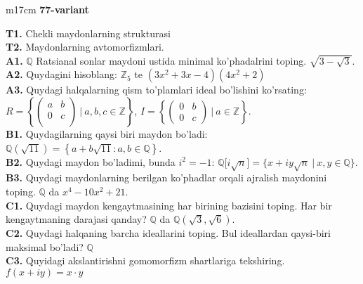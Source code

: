 \documentclass{article}
\begin{document}
\begin{tabular}{m{17cm}}
\textbf{77-variant}
\newline

\textbf{T1.} Chekli maydonlarning strukturasi \\
\textbf{T2.} Maydonlarning avtomorfizmlari. \\
\textbf{A1.} \(\mathbb{Q}\) Ratsianal sonlar maydoni ustida minimal ko'phadalrini toping.
\(\sqrt{3 - \sqrt{3}}\). \\
\textbf{A2.} Quydagini hisoblang:
\(\mathbb{Z}_{5}\) te \(\left( 3x^{2} + 3x - 4 \right)\left( 4x^{2} + 2 \right)\) \\
\textbf{A3.} Quydagi halqalarning qism to'plamlari ideal bo'lishini ko'rsating: \(R = \left\{ \begin{pmatrix}
a & b \\
0 & c \\
 & 
\end{pmatrix}\ |\ a,b,c \in \mathbb{Z} \right\}\), \(I = \left\{ \begin{pmatrix}
0 & b \\
0 & c
\end{pmatrix}\ |\ a \in \mathbb{Z} \right\}\). \\
\textbf{B1.} Quydagilarning qaysi biri maydon bo'ladi:
\(\mathbb{Q}\left( \sqrt{11} \right) = \left\{ a + b\sqrt{11}:a,b \in \mathbb{Q} \right\}\). \\
\textbf{B2.} Quydagi maydon bo'ladimi, bunda \(i^{2} = - 1\):
\(\mathbb{Q\lbrack}i\sqrt{n}\rbrack = \{ x + iy\sqrt{n}\ |\ x,y \in \mathbb{Q\}}\). \\
\textbf{B3.} Quydagi maydonlarning berilgan ko'phadlar orqali ajralish maydonini toping.
\(\mathbb{Q}\) da \(x^{4} - 10x^{2} + 21\). \\
\textbf{C1.} Quydagi maydon kengaytmasining har birining bazisini toping. Har bir kengaytmaning darajasi qanday?
\(\mathbb{Q}\) da \(\mathbb{Q}\left( \sqrt{3},\sqrt{6} \right)\). \\
\textbf{C2.} Quydagi halqaning barcha ideallarini toping. Bul ideallardan qaysi-biri maksimal bo'ladi? $\mathbb{Q}$ \\
\textbf{C3.} Quyidagi akslantirishni gomomorfizm shartlariga tekshiring. \(f(x + iy) = x \cdot y\) \\

\end{tabular}
\vspace{1cm}
\end{document}
